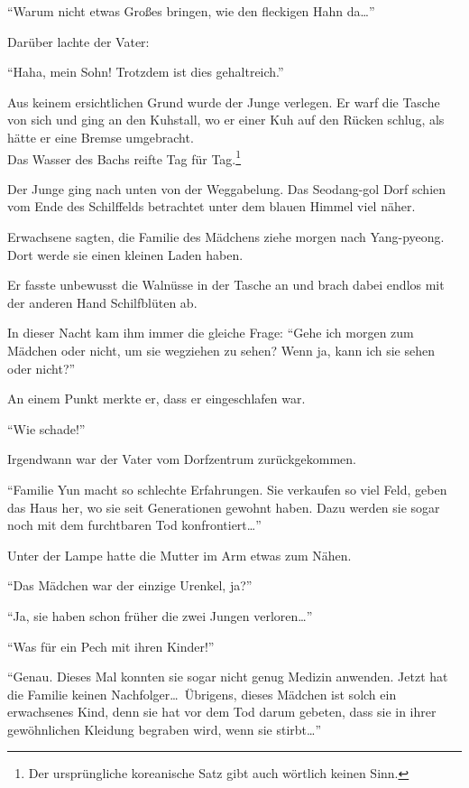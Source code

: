 \documentclass[prd,a4paper,12pt,tightenlines,notitlepage,nofootinbib]{revtex4-1}
\begin{document}
"`Warum nicht etwas Großes bringen, wie den fleckigen Hahn da\ldots"'

Darüber lachte der Vater:

"`Haha, mein Sohn!
Trotzdem ist dies gehaltreich."'

Aus keinem ersichtlichen Grund wurde der Junge verlegen.
Er warf die Tasche von sich und ging an den Kuhstall,
wo er einer Kuh auf den Rücken schlug,
als hätte er eine Bremse umgebracht.
\\

Das Wasser des Bachs reifte Tag für Tag.\footnote{Der ursprüngliche
  koreanische Satz gibt auch wörtlich keinen Sinn.}

Der Junge ging nach unten von der Weggabelung.
Das Seodang-gol Dorf schien vom Ende des Schilffelds betrachtet
unter dem blauen Himmel viel näher.

Erwachsene sagten,
die Familie des Mädchens ziehe morgen nach Yang-pyeong.
Dort werde sie einen kleinen Laden haben.

Er fasste unbewusst die Walnüsse in der Tasche an und
brach dabei endlos mit der anderen Hand Schilfblüten ab.

In dieser Nacht kam ihm immer die gleiche Frage:
"`Gehe ich morgen zum Mädchen oder nicht, um sie wegziehen zu sehen?
Wenn ja, kann ich sie sehen oder nicht?"'

An einem Punkt merkte er, dass er eingeschlafen war.

"`Wie schade!"'

Irgendwann war der Vater vom Dorfzentrum zurückgekommen.

"`Familie Yun macht so schlechte Erfahrungen.
Sie verkaufen so viel Feld,
geben das Haus her, wo sie seit Generationen gewohnt haben.
Dazu werden sie sogar noch mit dem furchtbaren Tod konfrontiert\ldots"'

Unter der Lampe hatte die Mutter im Arm etwas zum Nähen.

"`Das Mädchen war der einzige Urenkel, ja?"'

"`Ja, sie haben schon früher die zwei Jungen verloren\ldots"'

"`Was für ein Pech mit ihren Kinder!"'

"`Genau.
Dieses Mal konnten sie sogar nicht genug Medizin anwenden.
Jetzt hat die Familie keinen Nachfolger\ldots\
Übrigens, dieses Mädchen ist solch ein erwachsenes Kind,
denn sie hat vor dem Tod darum gebeten,
dass sie in ihrer gewöhnlichen Kleidung begraben wird,
wenn sie stirbt\ldots"'
\end{document}
